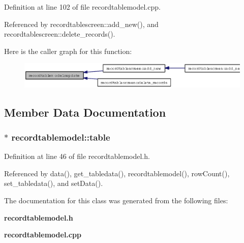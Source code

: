 Definition at line 102 of file recordtablemodel.cpp.

Referenced by recordtablescreen::add\_\-new(), and recordtablescreen::delete\_\-records().

Here is the caller graph for this function:\begin{figure}[H]
\begin{center}
\leavevmode
\includegraphics[width=327pt]{classrecordtablemodel_e19a2f856cd1dda4f1955af3544ce482_icgraph}
\end{center}
\end{figure}


\subsection{Member Data Documentation}
\subsubsection{$\ast$ {\bf recordtablemodel::table}\hspace{0.3cm}{\tt  [private]}}\label{classrecordtablemodel_e8ab912d7b127a5feb5b9ef8128541d0}




Definition at line 46 of file recordtablemodel.h.

Referenced by data(), get\_\-tabledata(), recordtablemodel(), row\-Count(), set\_\-tabledata(), and set\-Data().

The documentation for this class was generated from the following files:\begin{CompactItemize}
\item 
{\bf recordtablemodel.h}\item 
{\bf recordtablemodel.cpp}\end{CompactItemize}
